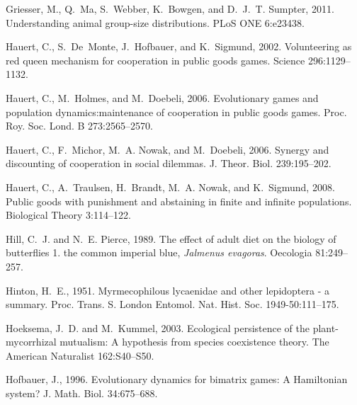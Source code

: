 \documentclass[a4paper]{scrartcl}
\begin{document}
\begin{thebibliography}{58}
Griesser, M., Q.~Ma, S.~Webber, K.~Bowgen, and D.~J.~T. Sumpter, 2011.
\newblock Understanding animal group-size distributions.
\newblock PLoS ONE 6:e23438.

Hauert, C., S.~De~Monte, J.~Hofbauer, and K.~Sigmund, 2002.
\newblock Volunteering as red queen mechanism for cooperation in public goods
  games.
\newblock Science 296:1129--1132.

Hauert, C., M.~Holmes, and M.~Doebeli, 2006{}.
\newblock Evolutionary games and population dynamics:maintenance of cooperation
  in public goods games.
\newblock Proc. Roy. Soc. Lond. B 273:2565--2570.

Hauert, C., F.~Michor, M.~A. Nowak, and M.~Doebeli, 2006{}.
\newblock Synergy and discounting of cooperation in social dilemmas.
\newblock J. Theor. Biol. 239:195--202.

Hauert, C., A.~Traulsen, H.~Brandt, M.~A. Nowak, and K.~Sigmund, 2008.
\newblock Public goods with punishment and abstaining in finite and infinite
  populations.
\newblock Biological Theory 3:114--122.

Hill, C.~J. and N.~E. Pierce, 1989.
\newblock The effect of adult diet on the biology of butterflies 1. the common
  imperial blue, \textit{Jalmenus evagoras}.
\newblock Oecologia 81:249--257.

Hinton, H.~E., 1951.
\newblock Myrmecophilous lycaenidae and other lepidoptera - a summary.
\newblock Proc. Trans. S. London Entomol. Nat. Hist. Soc. 1949-50:111--175.

Hoeksema, J.~D. and M.~Kummel, 2003.
\newblock Ecological persistence of the plant-mycorrhizal mutualism: A
  hypothesis from species coexistence theory.
\newblock The American Naturalist 162:S40--S50.

Hofbauer, J., 1996.
\newblock Evolutionary dynamics for bimatrix games: A {H}amiltonian system?
\newblock J. Math. Biol. 34:675--688.


\end{thebibliography}
\end{document}
